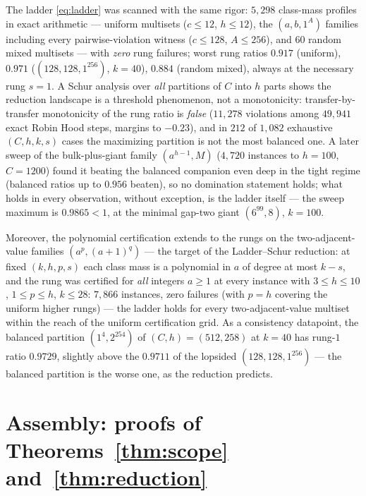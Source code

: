\documentclass[11pt]{article}
\theoremstyle{definition}
\begin{document}
The ladder \eqref{eq:ladder} was scanned with the same rigor:
$5{,}298$ class-mass profiles in exact arithmetic --- uniform
multisets ($c\le12$, $h\le12$), the $(a,b,1^A)$ families including
every pairwise-violation witness ($c\le128$, $A\le256$), and $60$
random mixed multisets --- with \emph{zero} rung failures; worst
rung ratios $0.917$ (uniform), $0.971$ ($(128,128,1^{256})$,
$k=40$), $0.884$ (random mixed), always at the necessary rung
$s=1$.  A Schur analysis over \emph{all} partitions of $C$ into $h$ parts
shows the reduction landscape is a threshold phenomenon, not a
monotonicity: transfer-by-transfer monotonicity of the rung ratio
is \emph{false} ($11{,}278$ violations among $49{,}941$ exact
Robin Hood steps, margins to $-0.23$), and in $212$ of $1{,}082$
exhaustive $(C,h,k,s)$ cases the maximizing partition is not the
most balanced one.  A later sweep of the bulk-plus-giant family
$(a^{h-1},M)$ ($4{,}720$ instances to $h=100$, $C=1200$) found it
beating the balanced companion even deep in the tight regime
(balanced ratios up to $0.956$ beaten), so no domination statement
holds; what holds in every observation, without exception, is the
ladder itself --- the sweep maximum is $0.9865<1$, at the minimal
gap-two giant $(6^{99},8)$, $k=100$.

Moreover, the polynomial certification extends to the rungs on the
two-adjacent-value families $(a^p,(a{+}1)^q)$ --- the target of the
Ladder--Schur reduction: at fixed $(k,h,p,s)$ each class mass is a
polynomial in $a$ of degree at most $k-s$, and the rung was
certified for \emph{all} integers $a\ge1$ at every instance with
$3\le h\le10$, $1\le p\le h$, $k\le28$: $7{,}866$ instances, zero
failures (with $p=h$ covering the uniform higher rungs) --- the
ladder holds for every two-adjacent-value multiset within the reach
of the uniform certification grid.
As a consistency datapoint, the balanced partition $(1^4,2^{254})$
of $(C,h)=(512,258)$ at $k=40$ has rung-$1$ ratio $0.9729$,
slightly above the $0.9711$ of the lopsided $(128,128,1^{256})$ ---
the balanced partition is the worse one, as the reduction predicts.

\section{Assembly: proofs of Theorems~\ref{thm:scope}
and~\ref{thm:reduction}}\label{sec:assembly}
\end{document}
